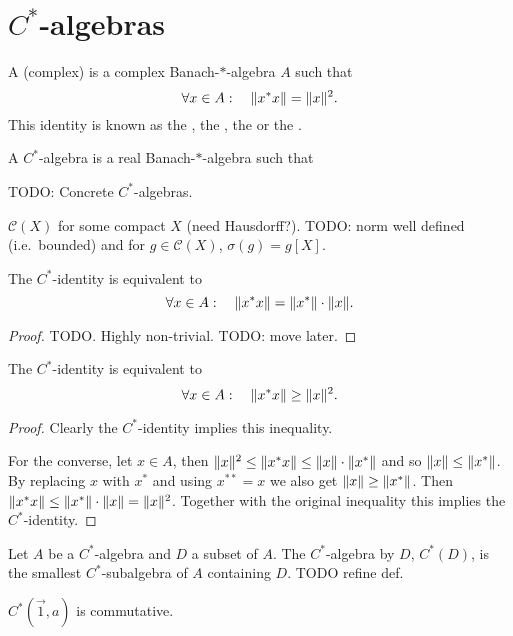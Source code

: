 \section{$C^*$-algebras}
\begin{definition}
A (complex)  is a complex Banach-$*$-algebra $A$ such that
\[\forall x\in A: \quad \lVert x^*x\rVert = \lVert x\rVert^2.\]
This identity is known as the , the , the  or the .
\end{definition}

\begin{definition}
A  $C^*$-algebra is a real Banach-$*$-algebra such that 
\end{definition}

\begin{example}
TODO: Concrete $C^*$-algebras.

$\mathcal{C}(X)$ for some compact $X$ (need Hausdorff?). TODO: norm well defined (i.e.\ bounded) and for $g\in \mathcal{C}(X)$, $\sigma(g) = g[X]$.
\end{example}

\begin{proposition}
The $C^*$-identity is equivalent to
\[\forall x\in A: \quad \lVert x^*x\rVert = \lVert x^*\rVert\cdot\lVert x\rVert.\]
\end{proposition}
\begin{proof}
TODO. Highly non-trivial. TODO: move later.
\end{proof}


\begin{lemma} \label{C*identityEquivalent}
The $C^*$-identity is equivalent to
\[\forall x\in A: \quad \lVert x^*x\rVert \geq \lVert x\rVert^2.\]
\end{lemma}
\begin{proof}
Clearly the $C^*$-identity implies this inequality.

For the converse, let $x\in A$, then $\lVert x\rVert^2 \leq \lVert x^*x\rVert \leq \lVert x\rVert\cdot\lVert x^*\rVert$ and so $\lVert x\rVert\leq \lVert x^*\rVert$. By replacing $x$ with $x^*$ and using $x^{**}=x$ we also get $\lVert x\rVert\geq \lVert x^*\rVert$. Then $\lVert x^*x\rVert\leq \lVert x^*\rVert\cdot\lVert x\rVert = \lVert x\rVert^2$. Together with the original inequality this implies the $C^*$-identity.
\end{proof}

\begin{definition}
Let $A$ be a $C^*$-algebra and $D$ a subset of $A$. The $C^*$-algebra  by $D$, $C^*(D)$, is the smallest $C^*$-subalgebra of $A$ containing $D$.
TODO refine def.
\end{definition}
\begin{lemma}
$C^*(\vec{1},a)$ is commutative.
\end{lemma}

